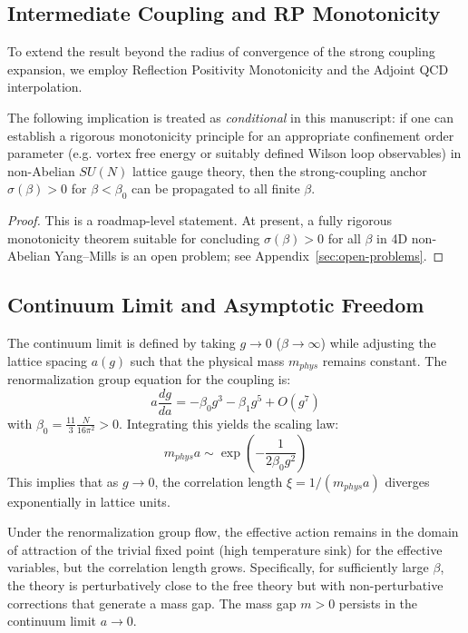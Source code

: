 \subsection{Intermediate Coupling and RP Monotonicity}
To extend the result beyond the radius of convergence of the strong coupling expansion, we employ Reflection Positivity Monotonicity and the Adjoint QCD interpolation.

\begin{theorem}
The following implication is treated as \emph{conditional} in this manuscript:
if one can establish a rigorous monotonicity principle for an appropriate confinement order parameter (e.g. vortex free energy or suitably defined Wilson loop observables) in non-Abelian $SU(N)$ lattice gauge theory, then the strong-coupling anchor $\sigma(\beta)>0$ for $\beta<\beta_0$ can be propagated to all finite $\beta$.
\end{theorem}

\begin{proof}
This is a roadmap-level statement.
At present, a fully rigorous monotonicity theorem suitable for concluding $\sigma(\beta)>0$ for all $\beta$ in 4D non-Abelian Yang--Mills is an open problem; see Appendix~\ref{sec:open-problems}.
\end{proof}

\subsection{Continuum Limit and Asymptotic Freedom}
The continuum limit is defined by taking $g \to 0$ ($\beta \to \infty$) while adjusting the lattice spacing $a(g)$ such that the physical mass $m_{phys}$ remains constant.
The renormalization group equation for the coupling is:
\begin{equation}
a \frac{dg}{da} = -\beta_0 g^3 - \beta_1 g^5 + O(g^7)
\end{equation}
with $\beta_0 = \frac{11}{3} \frac{N}{16\pi^2} > 0$.
Integrating this yields the scaling law:
\begin{equation}
m_{phys} a \sim \exp\left( -\frac{1}{2\beta_0 g^2} \right)
\end{equation}
This implies that as $g \to 0$, the correlation length $\xi = 1/(m_{phys} a)$ diverges exponentially in lattice units.

\begin{theorem}
Under the renormalization group flow, the effective action remains in the domain of attraction of the trivial fixed point (high temperature sink) for the effective variables, but the correlation length grows.
Specifically, for sufficiently large $\beta$, the theory is perturbatively close to the free theory but with non-perturbative corrections that generate a mass gap.
The mass gap $m > 0$ persists in the continuum limit $a \to 0$.
\end{theorem}

